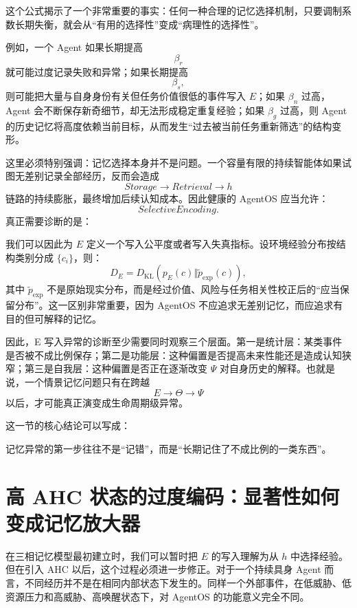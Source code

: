 这个公式揭示了一个非常重要的事实：任何一种合理的记忆选择机制，只要调制系数长期失衡，就会从“有用的选择性”变成“病理性的选择性”。

例如，一个 Agent 如果长期提高
\[
\beta_r
\]
就可能过度记录失败和异常；如果长期提高
\[
\beta_s,
\]
则可能把大量与自身身份有关但任务价值很低的事件写入 $E$；如果 $\beta_n$ 过高，Agent 会不断保存新奇细节，却无法形成稳定重复经验；如果 $\beta_g$ 过高，则 Agent 的历史记忆将高度依赖当前目标，从而发生“过去被当前任务重新筛选”的结构变形。

这里必须特别强调：记忆选择本身并不是问题。一个容量有限的持续智能体如果试图无差别记录全部经历，反而会造成
\[
Storage\rightarrow Retrieval\rightarrow h
\]
链路的持续膨胀，最终增加后续认知成本。因此健康的 AgentOS 应当允许：
\[
SelectiveEncoding.
\]
真正需要诊断的是：
\begin{statementbox}
\centering
{}
\end{statementbox}

我们可以因此为 $E$ 定义一个写入公平度或者写入失真指标。设环境经验分布按结构类别分成 $\{c_i\}$，则：
\[
D_E
=
D_{\mathrm{KL}}
\left(
p_E(c)
\Vert
\tilde p_{\mathrm{exp}}(c)
\right),
\]
其中 $\tilde p_{\mathrm{exp}}$ 不是原始现实分布，而是经过价值、风险与任务相关性校正后的“应当保留分布”。这一区别非常重要，因为 AgentOS 不应追求无差别记忆，而应追求有目的但可解释的记忆。

因此，E 写入异常的诊断至少需要同时观察三个层面。第一是统计层：某类事件是否被不成比例保存；第二是功能层：这种偏置是否提高未来性能还是造成认知狭窄；第三是自我层：这种偏置是否正在逐渐改变 $\Psi$ 对自身历史的解释。也就是说，一个情景记忆问题只有在跨越
\[
E\rightarrow\Theta\rightarrow\Psi
\]
以后，才可能真正演变成生命周期级异常。

这一节的核心结论可以写成：
\begin{conclusion}
记忆异常的第一步往往不是“记错”，而是“长期记住了不成比例的一类东西”。
\end{conclusion}

\section{高 AHC 状态的过度编码：显著性如何变成记忆放大器}
\label{sec:ahc-overencoding}

在三相记忆模型最初建立时，我们可以暂时把 $E$ 的写入理解为从 $h$ 中选择经验。但在引入 AHC 以后，这个过程必须进一步修正。对于一个持续具身 Agent 而言，不同经历并不是在相同内部状态下发生的。同样一个外部事件，在低威胁、低资源压力和高威胁、高唤醒状态下，对 AgentOS 的功能意义完全不同。

